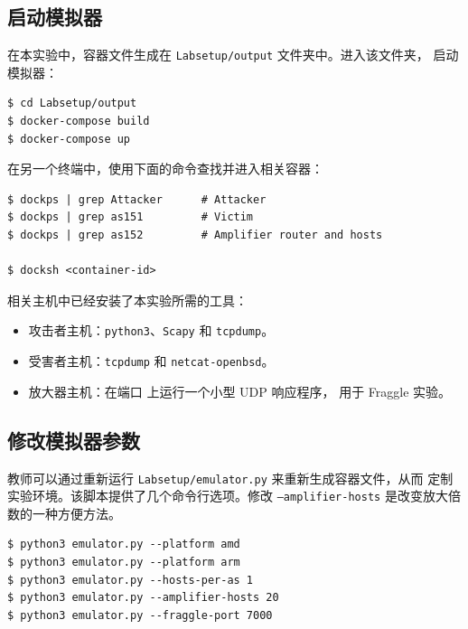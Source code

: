 \subsection{启动模拟器}



在本实验中，容器文件生成在 \texttt{Labsetup/output} 文件夹中。进入该文件夹，
启动模拟器：

\begin{lstlisting}
$ cd Labsetup/output
$ docker-compose build
$ docker-compose up
\end{lstlisting}

在另一个终端中，使用下面的命令查找并进入相关容器：

\begin{lstlisting}
$ dockps | grep Attacker      # Attacker
$ dockps | grep as151         # Victim
$ dockps | grep as152         # Amplifier router and hosts

$ docksh <container-id>
\end{lstlisting}

相关主机中已经安装了本实验所需的工具：
\begin{itemize}[noitemsep]
\item 攻击者主机：\texttt{python3}、\texttt{Scapy} 和 \texttt{tcpdump}。
\item 受害者主机：\texttt{tcpdump} 和 \texttt{netcat\allowbreak-openbsd}。
\item 放大器主机：在端口 \fraggleport 上运行一个小型 UDP 响应程序，
      用于 Fraggle 实验。
\end{itemize}


\subsection{修改模拟器参数}

教师可以通过重新运行 \texttt{Labsetup/emulator.py} 来重新生成容器文件，从而
定制实验环境。该脚本提供了几个命令行选项。修改
\texttt{--amplifier-hosts} 是改变放大倍数的一种方便方法。

\begin{lstlisting}
$ python3 emulator.py --platform amd
$ python3 emulator.py --platform arm
$ python3 emulator.py --hosts-per-as 1
$ python3 emulator.py --amplifier-hosts 20
$ python3 emulator.py --fraggle-port 7000
\end{lstlisting}



